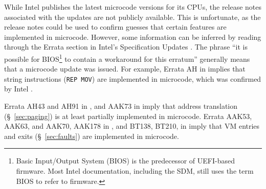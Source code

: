 While Intel publishes the latest microcode versions for its CPUs, the release
notes associated with the updates are not publicly available. This is
unfortunate, as the release notes could be used to confirm guesses that certain
features are implemented in microcode. However, some information can be
inferred by reading through the Errata section in Intel's Specification Updates
\cite{intel2010errata, intel2015errata, intel2015errata2}. The phrase ``it is
possible for BIOS\footnote{Basic Input/Output System (BIOS)
is the predecessor of UEFI-based firmware. Most Intel documentation, including
the SDM, still uses the term BIOS to refer to firmware.} to contain a
workaround for this erratum'' generally means that a microcode update was
issued. For example, Errata AH in \cite{intel2010errata} implies that string
instructions (\texttt{REP MOV}) are implemented in microcode, which was
confirmed by Intel \cite{abraham2006repmov}.

Errata AH43 and AH91 in \cite{intel2010errata}, and AAK73 in
\cite{intel2015errata} imply that address translation (\S~\ref{sec:paging}) is
at least partially implemented in microcode. Errata AAK53, AAK63, and AAK70,
AAK178 in \cite{intel2015errata}, and BT138, BT210,  in \cite{intel2015errata2}
imply that VM entries and exits (\S~\ref{sec:faults}) are implemented in
microcode.
